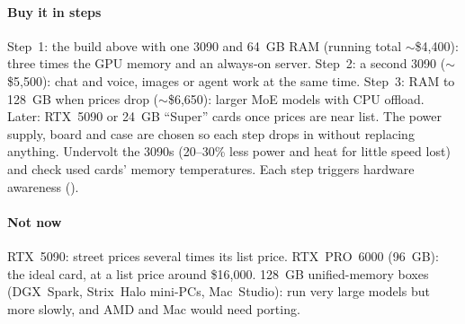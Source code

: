 \paragraph{Buy it in steps} Step~1: the build above with one 3090 and 64~GB RAM (running total $\sim$\$4,400): three times the GPU memory and an always-on server. Step~2: a second 3090 ($\sim$\$5,500): chat and voice, images or agent work at the same time. Step~3: RAM to 128~GB when prices drop ($\sim$\$6,650): larger MoE models with CPU offload. Later: RTX~5090 or 24~GB ``Super'' cards once prices are near list. The power supply, board and case are chosen so each step drops in without replacing anything. Undervolt the 3090s (20--30\% less power and heat for little speed lost) and check used cards' memory temperatures. Each step triggers hardware awareness ().

\paragraph{Not now} RTX~5090: street prices several times its list price. RTX~PRO~6000 (96~GB): the ideal card, at a list price around \$16,000. 128~GB unified-memory boxes (DGX~Spark, Strix~Halo mini-PCs, Mac~Studio): run very large models but more slowly, and AMD and Mac would need porting.

